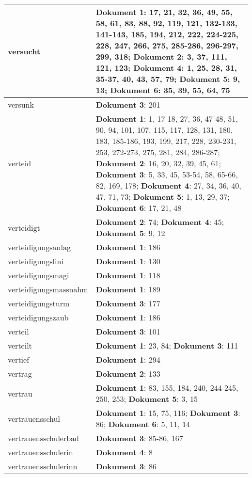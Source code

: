 \documentclass[a5paper]{article}
\begin{document}
\begin{longtable}[l]{|l|p{3in}|}
\hline
versucht & \textbf{Dokument 1}: 17, 21, 32, 36, 49, 55, 58, 61, 83, 88, 92, 119, 121, 132-133, 141-143, 185, 194, 212, 222, 224-225, 228, 247, 266, 275, 285-286, 296-297, 299, 318; \textbf{Dokument 2}: 3, 37, 111, 121, 123; \textbf{Dokument 4}: 1, 25, 28, 31, 35-37, 40, 43, 57, 79; \textbf{Dokument 5}: 9, 13; \textbf{Dokument 6}: 35, 39, 55, 64, 75 \\
\hline
versunk & \textbf{Dokument 3}: 201 \\
\hline
verteid & \textbf{Dokument 1}: 1, 17-18, 27, 36, 47-48, 51, 90, 94, 101, 107, 115, 117, 128, 131, 180, 183, 185-186, 193, 199, 217, 228, 230-231, 253, 272-273, 275, 281, 284, 286-287; \textbf{Dokument 2}: 16, 20, 32, 39, 45, 61; \textbf{Dokument 3}: 5, 33, 45, 53-54, 58, 65-66, 82, 169, 178; \textbf{Dokument 4}: 27, 34, 36, 40, 47, 71, 73; \textbf{Dokument 5}: 1, 13, 29, 37; \textbf{Dokument 6}: 17, 21, 48 \\
\hline
verteidigt & \textbf{Dokument 2}: 74; \textbf{Dokument 4}: 45; \textbf{Dokument 5}: 9, 12 \\
\hline
verteidigungsanlag & \textbf{Dokument 1}: 186 \\
\hline
verteidigungslini & \textbf{Dokument 1}: 130 \\
\hline
verteidigungsmagi & \textbf{Dokument 1}: 118 \\
\hline
verteidigungsmassnahm & \textbf{Dokument 1}: 189 \\
\hline
verteidigungsturm & \textbf{Dokument 3}: 177 \\
\hline
verteidigungszaub & \textbf{Dokument 1}: 186 \\
\hline
verteil & \textbf{Dokument 3}: 101 \\
\hline
verteilt & \textbf{Dokument 1}: 23, 84; \textbf{Dokument 3}: 111 \\
\hline
vertief & \textbf{Dokument 1}: 294 \\
\hline
vertrag & \textbf{Dokument 2}: 133 \\
\hline
vertrau & \textbf{Dokument 1}: 83, 155, 184, 240, 244-245, 250, 253; \textbf{Dokument 5}: 3, 15 \\
\hline
vertrauensschul & \textbf{Dokument 1}: 15, 75, 116; \textbf{Dokument 3}: 86; \textbf{Dokument 6}: 5, 11, 14 \\
\hline
vertrauensschulerbad & \textbf{Dokument 3}: 85-86, 167 \\
\hline
vertrauensschulerin & \textbf{Dokument 4}: 8 \\
\hline
vertrauensschulerinn & \textbf{Dokument 3}: 86 \\

\end{longtable}
\end{document}
